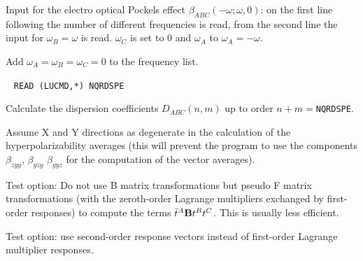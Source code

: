 \begin{description}
   Input for the electro optical Pockels effect 
   $\beta_{ABC}(-\omega;\omega,0)$:
   on the first line following  the number of different
   frequencies is read, from the second line the input for 
   $\omega_B = \omega$ is read. $\omega_C$ is set to $0$ and
   $\omega_A$ to $\omega_A = -\omega$.

\item[\Key{STATIC}] 
   Add $\omega_A = \omega_B = \omega_C = 0$ to the frequency list.

\item[\Key{DISPCF}]  \verb| |\newline
   \verb|READ (LUCMD,*) NQRDSPE|

   Calculate the dispersion coefficients 
   $D_{ABC}(n,m)$ up to order $n+m =$\verb+NQRDSPE+. 
 

\item[\Key{XYDEGE}] 
Assume X and Y directions as degenerate in the calculation
of the hyperpolarizability averages (this will prevent
the program to use the components $\beta_{zyy}$, $\beta_{yzy}$
$\beta_{yyz}$ for the computation of the vector averages).

\item[\Key{NOBMAT}] 
Test option:
Do not use B matrix transformations but pseudo F matrix 
transformations (with the zeroth-order Lagrange multipliers 
exchanged by first-order responses) to compute the terms
$\bar{t}^A {\bf B} t^{B} t^{C}$. This is usually less
efficient.

\item[\Key{USE R2}] 
Test option: use second-order response vectors instead of
first-order Lagrange multiplier responses.
 
\end{description}
